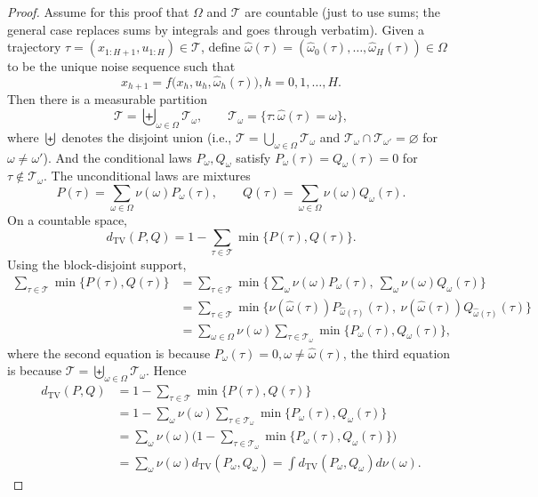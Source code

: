 \documentclass{article}
\begin{document}
\begin{proof}
Assume for this proof that $\Omega$ and $\mathcal T$ are countable (just to use sums; the general case replaces sums by integrals and goes through verbatim). Given a trajectory $\tau=(x_{1:H+1}, u_{1:H})\in\mathcal T$,
define $\hat\omega(\tau)=(\hat\omega_0(\tau),\ldots,\hat\omega_{H}(\tau))\in\Omega$
to be the unique noise sequence such that
\begin{equation*}
x_{h+1}=f\bigl(x_h,u_h,\hat\omega_h(\tau)\bigr),h=0,1,\ldots,H.
\end{equation*}
Then there is a measurable partition
\begin{equation*}
\mathcal T=\biguplus_{\omega\in\Omega}\mathcal T_\omega,\qquad
\mathcal T_\omega=\{\tau:\widehat\omega(\tau)=\omega\},
\end{equation*}
 where $\biguplus$ denotes the disjoint union (i.e., $\mathcal T=\bigcup_{\omega\in\Omega}\mathcal T_\omega$ and $\mathcal T_\omega\cap\mathcal T_{\omega'}=\varnothing$ for $\omega\neq\omega'$). And the conditional laws $P_\omega,Q_\omega$ satisfy $P_\omega(\tau)=Q_\omega(\tau)=0$ for $\tau\notin\mathcal T_\omega$.
The unconditional laws are mixtures
\begin{equation*}
P(\tau)=\sum_{\omega\in\Omega}\nu(\omega)P_\omega(\tau),\qquad
Q(\tau)=\sum_{\omega\in\Omega}\nu(\omega)Q_\omega(\tau).
\end{equation*}
On a countable space,
\begin{equation*}
d_{\mathrm{TV}}(P,Q)=1-\sum_{\tau\in\mathcal T}\min\{P(\tau),Q(\tau)\}.
\end{equation*}
Using the block-disjoint support,
\begin{align*}
\sum_{\tau\in\mathcal T}\min\{P(\tau),Q(\tau)\}
&=\sum_{\tau\in\mathcal T}\min\Big\{\sum_{\omega}\nu(\omega)P_\omega(\tau),\ \sum_{\omega}\nu(\omega)Q_\omega(\tau)\Big\}\\
&=\sum_{\tau\in\mathcal T}\min\big\{\nu(\widehat\omega(\tau))P_{\widehat\omega(\tau)}(\tau),\ \nu(\widehat\omega(\tau))Q_{\widehat\omega(\tau)}(\tau)\big\}\\
&=\sum_{\omega\in\Omega}\nu(\omega)\sum_{\tau\in\mathcal T_\omega}\min\{P_\omega(\tau),Q_\omega(\tau)\},
\end{align*}
where the second equation is because $P_\omega(\tau)=0, \omega \neq \hat \omega(\tau)$, the third equation is because $\mathcal T=\biguplus_{\omega\in\Omega}\mathcal T_\omega$.
Hence
\begin{align*}
d_{\mathrm{TV}}(P,Q)
&=1-\sum_{\tau\in\mathcal T}\min\{P(\tau),Q(\tau)\}\\
&=1-\sum_{\omega}\nu(\omega)\sum_{\tau\in\mathcal T_\omega}\min\{P_\omega(\tau),Q_\omega(\tau)\}\\
&=\sum_{\omega}\nu(\omega)\Big(1-\sum_{\tau\in\mathcal T_\omega}\min\{P_\omega(\tau),Q_\omega(\tau)\}\Big)\\
&=\sum_{\omega}\nu(\omega)d_{\mathrm{TV}}(P_\omega,Q_\omega)
=\int d_{\mathrm{TV}}(P_\omega,Q_\omega)d\nu(\omega).
\end{align*}


\end{proof}
\end{document}
